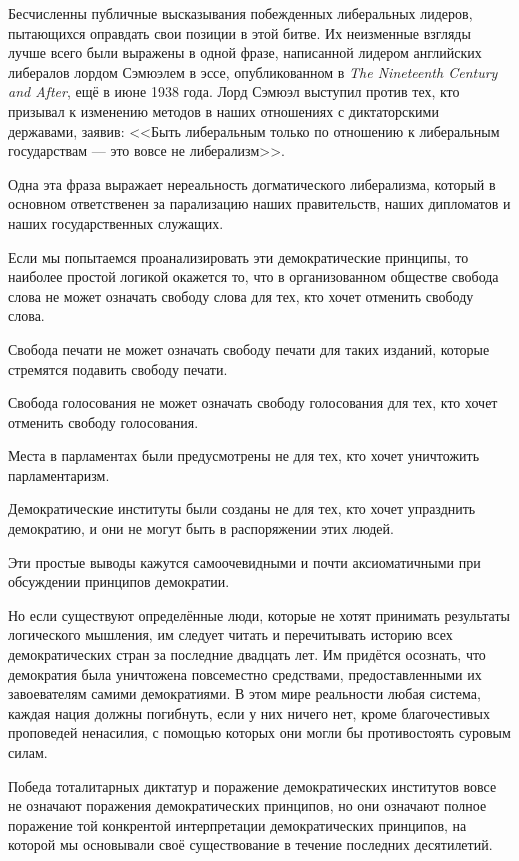 Бесчисленны публичные высказывания побежденных либеральных лидеров, пытающихся оправдать свои позиции в этой битве. Их неизменные взгляды лучше всего были выражены в одной фразе, написанной лидером английских либералов лордом Сэмюэлем в эссе, опубликованном в \textit{The Nineteenth Century and After}, ещё в июне 1938 года. Лорд Сэмюэл выступил против тех, кто призывал к изменению методов в наших отношениях с диктаторскими державами, заявив: <<Быть либеральным только по отношению к либеральным государствам — это вовсе не либерализм>>.

Одна эта фраза выражает нереальность догматического либерализма, который в основном ответственен за парализацию наших правительств, наших дипломатов и наших государственных служащих.

Если мы попытаемся проанализировать эти демократические принципы, то наиболее простой логикой окажется то, что в организованном обществе свобода слова не может означать свободу слова для тех, кто хочет отменить свободу слова.

Свобода печати не может означать свободу печати для таких изданий, которые стремятся подавить свободу печати.

Свобода голосования не может означать свободу голосования для тех, кто хочет отменить свободу голосования.

Места в парламентах были предусмотрены не для тех, кто хочет уничтожить парламентаризм.

Демократические институты были созданы не для тех, кто хочет упразднить демократию, и они не могут быть в распоряжении этих людей.

Эти простые выводы кажутся самоочевидными и почти аксиоматичными при обсуждении принципов демократии.

Но если существуют определённые люди, которые не хотят принимать результаты логического мышления, им следует читать и перечитывать историю всех демократических стран за последние двадцать лет. Им придётся осознать, что демократия была уничтожена повсеместно средствами, предоставленными их завоевателям самими демократиями. В этом мире реальности любая система, каждая нация должны погибнуть, если у них ничего нет, кроме благочестивых проповедей ненасилия, с помощью которых они могли бы противостоять суровым силам.

Победа тоталитарных диктатур и поражение демократических институтов вовсе не означают поражения демократических принципов, но они означают полное поражение той конкрентой интерпретации демократических принципов, на которой мы основывали своё существование в течение последних десятилетий.

